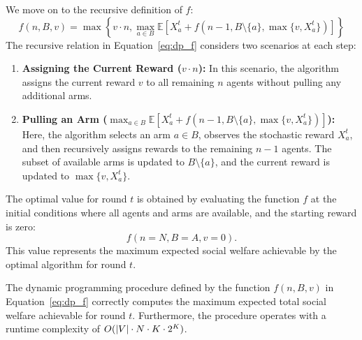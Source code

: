 We move on to the recursive definition of $f$:
\begin{equation}\label{eq:dp_f}
f(n, B, v) = \max \left\{ v \cdot n, \max_{a \in B} \mathbb{E}\left[ X_a^t + f\left(n - 1, B \setminus \{a\}, \max\{v, X_a^t\} \right) \right] \right\}
\end{equation}
The recursive relation in Equation~\eqref{eq:dp_f} considers two scenarios at each step:
\begin{enumerate}
    \item \textbf{Assigning the Current Reward ($v \cdot n$):} In this scenario, the algorithm assigns the current reward $v$ to all remaining $n$ agents without pulling any additional arms.
    
    \item \textbf{Pulling an Arm ($\max_{a \in B} \mathbb{E}\left[ X_a^t + f\left(n - 1, B \setminus \{a\}, \max\{v, X_a^t\} \right) \right]$):} Here, the algorithm selects an arm $a \in B$, observes the stochastic reward $X_a^t$, and then recursively assigns rewards to the remaining $n - 1$ agents. The subset of available arms is updated to $B \setminus \{a\}$, and the current reward is updated to $\max\{v, X_a^t\}$.
\end{enumerate}

The optimal value for round $t$ is obtained by evaluating the function $f$ at the initial conditions where all agents and arms are available, and the starting reward is zero:
\[
f(n = N, B = A, v = 0).
\]
This value represents the maximum expected social welfare achievable by the optimal algorithm for round $t$. 

\begin{theorem}\label{thm:optimality_runtime}
    The dynamic programming procedure defined by the function $f(n, B, v)$ in Equation~\eqref{eq:dp_f} correctly computes the maximum expected total social welfare achievable for round $t$. Furthermore, the procedure operates with a runtime complexity of $O(\left\lvert V\right\rvert \cdot N\cdot K\cdot 2^K)$.
\end{theorem}

